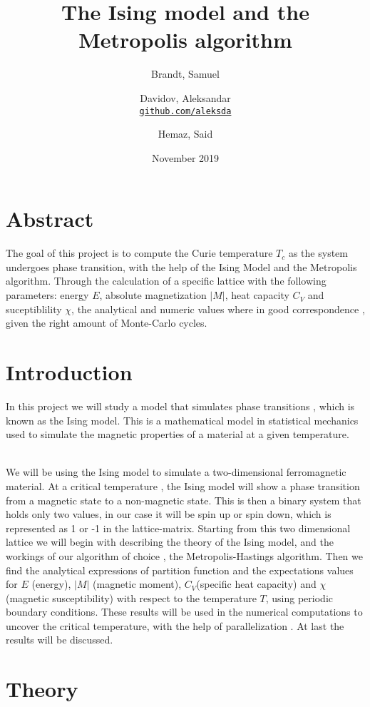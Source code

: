 \documentclass{article}
\title{The Ising model and the Metropolis algorithm}
\author{
  Brandt, Samuel\\
  \and
  Davidov, Aleksandar\\
  \textcolor{blue}{\href{https://github.com/aleksda/FYS4150/}{\texttt{github.com/aleksda}}}
  \and
  Hemaz, Said\\
}
\date{November 2019}
\begin{document}
\maketitle

\section{Abstract}

The goal of this project is to compute the Curie temperature  $T_c$ as the system undergoes phase transition, with the help of the Ising Model and the Metropolis algorithm. Through the calculation of a specific lattice with the following parameters: energy $E$, absolute magnetization  $|M|$, heat capacity   $C_V$ and suceptiblility  $\chi$, the analytical and numeric values where in good correspondence , given the right amount of Monte-Carlo cycles.
\newpage
\tableofcontents
\newpage
\section{Introduction}

In this project we will study a model that simulates phase transitions , which is known as the Ising model. This is a mathematical model in statistical mechanics used to simulate the magnetic properties of a material at a given temperature.\\\

We will be using the Ising model to simulate a two-dimensional ferromagnetic material. At a critical temperature , the Ising model will show a phase transition from a magnetic state to a non-magnetic state. This is then a binary system that holds only two values, in our case it will be spin up or spin down, which is represented as 1 or -1 in the lattice-matrix. Starting from this two dimensional lattice we will begin with describing the theory of the Ising model, and the workings of our algorithm of choice , the Metropolis-Hastings algorithm. Then we find the analytical expressions of partition function and the expectations values for  $E$ (energy), $|M|$ (magnetic moment),  $C_V$(specific heat capacity) and  $\chi$ (magnetic susceptibility) with respect to the temperature $T$, using periodic boundary conditions. These results will be used in the numerical computations to uncover the critical temperature, with the help of parallelization . At last the results will be discussed.

\section{Theory}
\end{document}
